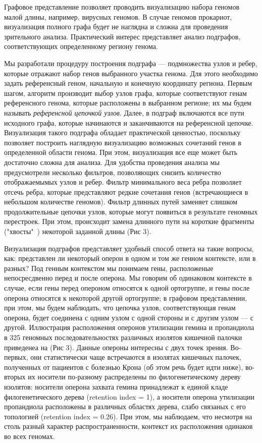 Графовое представление позволяет проводить визуализацию набора геномов малой длины, например, вирусных геномов. В случае геномов прокариот, визуализация полного графа будет не наглядна и сложна для проведения зрительного анализа. Практический интерес представляет анализ подграфов, соответствующих определенному региону генома.   

Мы разработали процедуру построения подграфа --- подмножества узлов и ребер, которые отражают набор генов выбранного участка генома. Для этого необходимо задать референсный геном, начальную и конечную координату региона. Первым шагом, алгоритм производит выбор узлов графа, которые соответствуют генам референсного генома, которые расположены в выбранном регионе; их мы будем называть \textit{референсной цепочкой узлов}. Далее, в подграф включаются все пути исходного графа, которые начинаются и заканчиваются на референсной цепочке. Визуализация такого подграфа обладает практической ценностью, поскольку позволяет построить наглядную визуализацию возможных сочетаний генов в определенной области генома. При этом, визуализация все еще может быть достаточно сложна для анализа. Для удобства проведения анализа мы предусмотрели несколько фильтров, позволяющих снизить количество отображаемымых узлов и ребер. Фильтр минимального веса ребра позволяет отсечь ребра, которые представляют редкие сочетания генов (встречающиеся в небольшом количестве геномов). Фильтр длинных путей заменяет слишком продолжительные цепочки узлов, которые могут появиться в результате геномных перестроек. При этом, происходит замена длинного пути на короткие фрагменты ("хвосты"\ ) некоторой заданной длины (Рис 3). 

Визуализация подграфов представляет удобный способ ответа на такие вопросы, как: представлен ли некоторый оперон в одном и том же генном контексте, или в разных? Под генным контекстом мы понимаем гены, расположеные непосресдвенно перед и после оперона. Мы говорим об одинаковом контексте в случае, если гены перед опероном относятся к одной ортогруппе, и гены после оперона относятся к некоторой другой ортогруппе; в графовом представлении, при этом, мы будем наблюдать, что цепочка узлов, соответствующая генам оперона, будет соединена с одним узлом с одной стороны и с другим узлом --- с другой. Иллюстрация расположения оперонов утилизации гемина и пропандиола в 325 геномных последовательностях различных изолятов кишечной палочки приведенеа на (Рис 3). Данные опероны интересны с двух точек зрения. Во-первых, они статистически чаще встречаются в изолятах кишечных палочек, полученных от пациентов с болезнью Крона (об этом речь будет идти ниже), во-вторых их носители по-разному распределены по филогенетическому дереву изолятов: носители оперона захвата гемина принадлежат к единой кладе филогенетического дерева (retention index = 1), а носители оперона утилизации пропандиола расположены в различных областях дерева, слабо связаных с его топологией (retention index = 0.26). При этом, мы наблюдаем, что несмотря на столь разный характер распространенности, контекст их расположения одинаков во всех геномах. 

